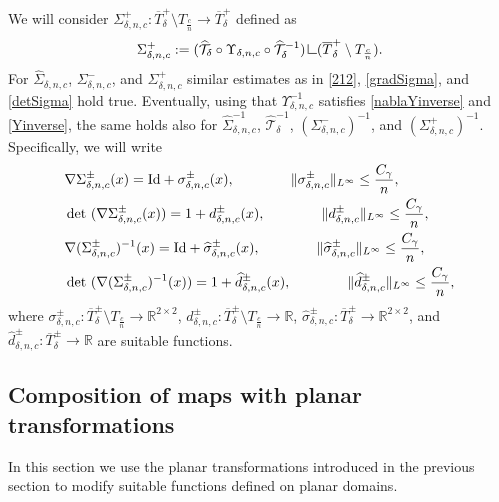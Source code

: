 \documentclass[a4paper,11pt]{article}
\numberwithin{equation}{section}
\def\det{\,{\rm det\ }}
\newcommand{\R}{\mathbb{R}}
\newcommand{\res}      {\mathop{\hbox{\vrule height 7pt width .5pt depth
                        0pt\vrule height .5pt width 6pt depth 0pt}}\nolimits}
\begin{document}
We will consider $ \Sigma_{\delta,n,c}^+:\overline T_\delta^+\setminus T_{\frac cn}\rightarrow \overline T^+_\delta$ defined as
\begin{align}\label{Sigma+}
\Sigma^+_{\delta,n,c}:=(\widehat {\mathcal T}_\delta \circ \Upsilon_{\delta,n,c}\circ \widehat{\mathcal T}_\delta^{-1})\res (\overline T_\delta^+\setminus  T_{\frac cn}).
\end{align} 
For $\widehat \Sigma_{\delta,n,c}$, $\Sigma_{\delta,n,c}^-$, and $\Sigma_{\delta,n,c}^+$ similar estimates as in \eqref{212}, \eqref{gradSigma}, and \eqref{detSigma} hold true. Eventually, using that $\Upsilon_{\delta,n,c}^{-1}$ satisfies \eqref{nablaYinverse} and \eqref{Yinverse}, the same holds also for $\widehat \Sigma_{\delta,n,c}^{-1}$, $\widehat {\mathcal T}_\delta^{-1}$, $(\Sigma_{\delta,n,c}^-)^{-1}$, and $(\Sigma_{\delta,n,c}^+)^{-1}$. Specifically, we will write
\begin{align}\label{nablaSigmapm}
&\nabla \Sigma^\pm_{\delta,n,c}(x)=\text{{\rm Id}}+\sigma^\pm_{\delta,n,c}(x),\qquad \qquad \|\sigma^\pm_{\delta,n,c}\|_{L^\infty}\leq \frac {C_\gamma}{n},\nonumber\\
&\det(\nabla \Sigma^\pm_{\delta,n,c}(x))=1+d^\pm_{\delta,n,c}(x),\qquad \qquad\|d^\pm_{\delta,n,c}\|_{L^\infty}\leq \frac {C_\gamma}{n},\nonumber\\
&\nabla (\Sigma^\pm_{\delta,n,c})^{-1}(x)=\text{{\rm Id}}+\widehat\sigma^\pm_{\delta,n,c}(x),\qquad \qquad \|\widehat\sigma^\pm_{\delta,n,c}\|_{L^\infty}\leq \frac {C_\gamma}{n},\nonumber\\
&\det(\nabla (\Sigma^\pm_{\delta,n,c})^{-1}(x))=1+\widehat d^\pm_{\delta,n,c}(x),\qquad \qquad\|\widehat d^\pm_{\delta,n,c}\|_{L^\infty}\leq \frac {C_\gamma}{n},
\end{align}
where $\sigma_{\delta,n,c}^\pm:\overline T_\delta^\pm\setminus  T_{\frac cn}\rightarrow \R^{2\times 2}$, $d^\pm_{\delta,n,c}:\overline T_\delta^\pm\setminus  T_{\frac cn}\rightarrow \R$, $\widehat \sigma_{\delta,n,c}^\pm:\overline T_\delta^\pm\rightarrow \R^{2\times 2}$, and $\widehat d^\pm_{\delta,n,c}:\overline T_\delta^\pm\rightarrow \R$ are suitable functions.   


\subsection{Composition of maps with planar transformations}

In this section we use the planar transformations introduced in the previous section to modify suitable functions defined on planar domains.
\end{document}

